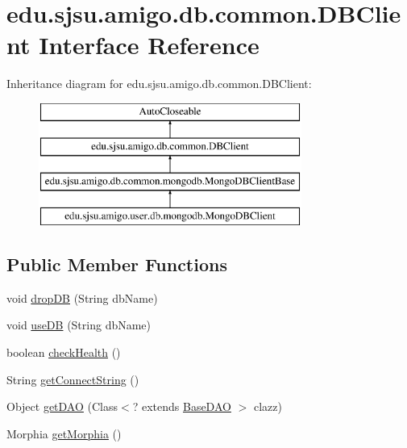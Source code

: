 \hypertarget{interfaceedu_1_1sjsu_1_1amigo_1_1db_1_1common_1_1_d_b_client}{}\section{edu.\+sjsu.\+amigo.\+db.\+common.\+D\+B\+Client Interface Reference}
\label{interfaceedu_1_1sjsu_1_1amigo_1_1db_1_1common_1_1_d_b_client}
Inheritance diagram for edu.\+sjsu.\+amigo.\+db.\+common.\+D\+B\+Client\+:\begin{figure}[H]
\begin{center}
\leavevmode
\includegraphics[height=4.000000cm]{interfaceedu_1_1sjsu_1_1amigo_1_1db_1_1common_1_1_d_b_client}
\end{center}
\end{figure}
\subsection*{Public Member Functions}
\begin{DoxyCompactItemize}
\item 
void \hyperlink{interfaceedu_1_1sjsu_1_1amigo_1_1db_1_1common_1_1_d_b_client_aaf5afc64d802275eb4b2f566166cd245}{drop\+DB} (String db\+Name)
\item 
void \hyperlink{interfaceedu_1_1sjsu_1_1amigo_1_1db_1_1common_1_1_d_b_client_a0bc8dff41980a640f09af840f9a361e5}{use\+DB} (String db\+Name)
\item 
boolean \hyperlink{interfaceedu_1_1sjsu_1_1amigo_1_1db_1_1common_1_1_d_b_client_af6387539a42d236e515d04bdf32e171d}{check\+Health} ()
\item 
String \hyperlink{interfaceedu_1_1sjsu_1_1amigo_1_1db_1_1common_1_1_d_b_client_ad69072c1ef72bd58d7f6ce71050c4c8f}{get\+Connect\+String} ()
\item 
Object \hyperlink{interfaceedu_1_1sjsu_1_1amigo_1_1db_1_1common_1_1_d_b_client_a82ddc58c08fa294ceb762b9443937964}{get\+D\+AO} (Class$<$? extends \hyperlink{interfaceedu_1_1sjsu_1_1amigo_1_1db_1_1common_1_1_base_d_a_o}{Base\+D\+AO} $>$ clazz)
\item 
Morphia \hyperlink{interfaceedu_1_1sjsu_1_1amigo_1_1db_1_1common_1_1_d_b_client_a501198821f5a98b90ae7f13c3743e655}{get\+Morphia} ()
\end{DoxyCompactItemize}


